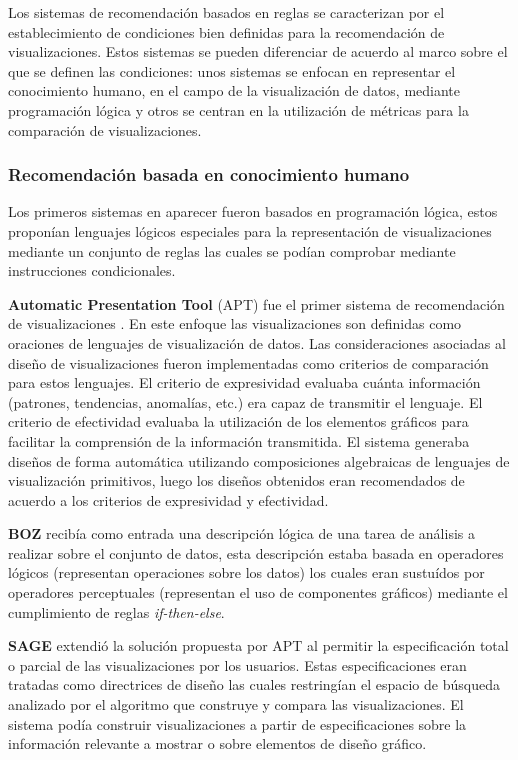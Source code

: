Los sistemas de recomendaci\'on basados en reglas se caracterizan por el establecimiento
de condiciones bien definidas para la recomendaci\'on de visualizaciones. Estos sistemas
se pueden diferenciar de acuerdo al marco sobre el que se definen las condiciones: unos sistemas
se enfocan en representar el conocimiento humano, en el campo de la visualizaci\'on de datos, mediante programaci\'on l\'ogica y 
otros se centran en la utilizaci\'on de m\'etricas para la comparaci\'on de visualizaciones.

\subsubsection{Recomendaci\'on basada en conocimiento humano}

Los primeros sistemas en aparecer fueron basados en programaci\'on l\'ogica, estos propon\'ian lenguajes
l\'ogicos especiales para la representaci\'on de visualizaciones mediante un conjunto de reglas las cuales
se pod\'ian comprobar mediante instrucciones condicionales.

\textbf{Automatic Presentation Tool} (APT) \cite{mackinlay1986automating} fue el primer sistema de recomendaci\'on de visualizaciones \cite{godfrey2016interactive}.
En este enfoque las visualizaciones son definidas como oraciones de lenguajes
de visualizaci\'on de datos. Las consideraciones asociadas al dise\~no de visualizaciones
fueron implementadas como criterios de comparaci\'on para estos lenguajes. El criterio de expresividad
evaluaba cu\'anta informaci\'on (patrones, tendencias, anomal\'ias, etc.) era capaz de
transmitir el lenguaje. El criterio de efectividad evaluaba la utilizaci\'on de los
elementos gr\'aficos para facilitar la comprensi\'on de la informaci\'on transmitida.
El sistema generaba dise\~nos de forma autom\'atica utilizando composiciones algebraicas
de lenguajes de visualizaci\'on primitivos, luego los dise\~nos obtenidos eran recomendados de acuerdo
a los criterios de expresividad y efectividad.

\textbf{BOZ} \cite{casner1991task} recib\'ia como entrada una descripci\'on l\'ogica de
una tarea de an\'alisis a realizar sobre el conjunto de datos, esta descripci\'on estaba
basada en operadores l\'ogicos (representan operaciones sobre los datos) los cuales eran
sustu\'idos por operadores perceptuales (representan el uso de componentes gr\'aficos) mediante
el cumplimiento de reglas \textit{if-then-else}.


\textbf{SAGE} \cite{roth1994interactive} extendi\'o la soluci\'on propuesta por APT al permitir
la especificaci\'on total o parcial de las visualizaciones por los usuarios. Estas especificaciones
eran tratadas como directrices de dise\~no las cuales restring\'ian el espacio de b\'usqueda
analizado por el algoritmo que construye y compara las visualizaciones. El sistema pod\'ia construir
visualizaciones a partir de especificaciones sobre la informaci\'on relevante a mostrar o sobre
elementos de dise\~no gr\'afico.

